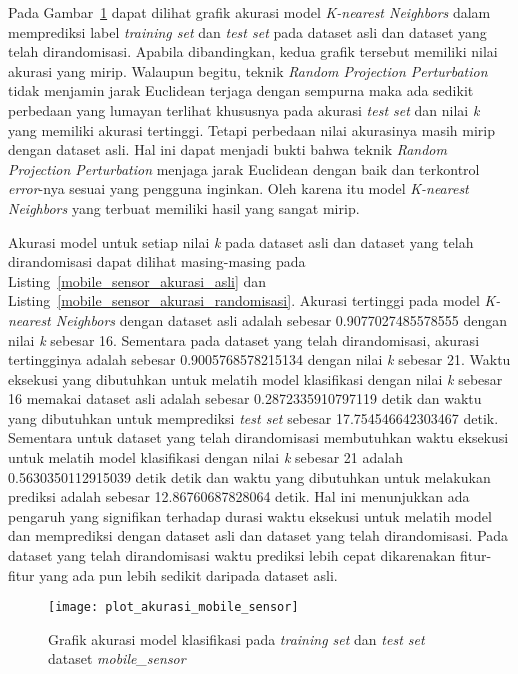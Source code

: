 Pada Gambar~\ref{fig:plot_akurasi_mobile_sensor} dapat dilihat grafik akurasi model \textit{K-nearest Neighbors} dalam memprediksi label \textit{training set} dan \textit{test set} pada dataset asli dan dataset yang telah dirandomisasi. Apabila dibandingkan, kedua grafik tersebut memiliki nilai akurasi yang mirip. Walaupun begitu, teknik \textit{Random Projection Perturbation} tidak menjamin jarak Euclidean terjaga dengan sempurna maka ada sedikit perbedaan yang lumayan terlihat khususnya pada akurasi \textit{test set} dan nilai \textit{k} yang memiliki akurasi tertinggi. Tetapi perbedaan nilai akurasinya masih mirip dengan dataset asli. Hal ini dapat menjadi bukti bahwa teknik \textit{Random Projection Perturbation} menjaga jarak Euclidean dengan baik dan terkontrol \textit{error}-nya sesuai yang pengguna inginkan. Oleh karena itu model \textit{K-nearest Neighbors} yang terbuat memiliki hasil yang sangat mirip.

Akurasi model untuk setiap nilai \textit{k} pada dataset asli dan dataset yang telah dirandomisasi dapat dilihat masing-masing pada Listing~\ref{mobile_sensor_akurasi_asli} dan Listing~\ref{mobile_sensor_akurasi_randomisasi}. Akurasi tertinggi pada model \textit{K-nearest Neighbors} dengan dataset asli adalah sebesar 0.9077027485578555 dengan nilai \textit{k} sebesar 16. Sementara pada dataset yang telah dirandomisasi, akurasi tertingginya adalah sebesar 0.9005768578215134 dengan nilai \textit{k} sebesar 21. Waktu eksekusi yang dibutuhkan untuk melatih model klasifikasi dengan nilai \textit{k} sebesar 16 memakai dataset asli adalah sebesar 0.2872335910797119 detik dan waktu yang dibutuhkan untuk memprediksi \textit{test set} sebesar 17.754546642303467 detik. Sementara untuk dataset yang telah dirandomisasi membutuhkan waktu eksekusi untuk melatih model klasifikasi dengan nilai \textit{k} sebesar 21 adalah 0.5630350112915039 detik detik dan waktu yang dibutuhkan untuk melakukan prediksi adalah sebesar 12.86760687828064 detik. Hal ini menunjukkan ada pengaruh yang signifikan terhadap durasi waktu eksekusi untuk melatih model dan memprediksi dengan dataset asli dan dataset yang telah dirandomisasi. Pada dataset yang telah dirandomisasi waktu prediksi lebih cepat dikarenakan fitur-fitur yang ada pun lebih sedikit daripada dataset asli.

\begin{figure}
	\centering
	\texttt{[image: plot\_akurasi\_mobile\_sensor]}
	\caption{Grafik akurasi model klasifikasi pada \textit{training set} dan \textit{test set} dataset \textit{mobile\_sensor}}
	\label{fig:plot_akurasi_mobile_sensor}
\end{figure}

